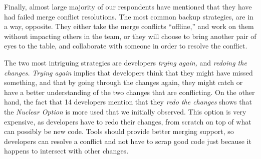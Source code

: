 

Finally, almost large majority of our respondents have mentioned that they have had failed merge conflict resolutions.
The most common backup strategies, are in a way, opposite.
They either take the merge conflicts ``offline,'' and work on them without impacting others in the team, or they will choose to bring another pair of eyes to the table, and collaborate with someone in order to resolve the conflict.

The two most intriguing strategies are developers \emph{trying again,} and \emph{redoing the changes.}
\emph{Trying again} implies that developers think that they might have missed something, and that by going through the changes again, they might catch or have a better understanding of the two changes that are conflicting.
On the other hand, the fact that 14 developers mention that they \emph{redo the changes} shows that the \emph{Nuclear Option} is more used that we initially observed.
This option is very expensive, as developers have to redo their changes, from scratch on top of what can possibly be new code.
Tools should provide better merging support, so developers can resolve a conflict and not have to scrap good code just because it happens to intersect with other changes.

